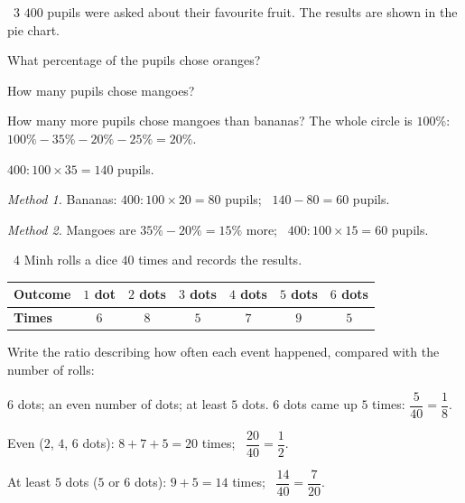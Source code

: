 \begin{exbox}{\ExWord\ 3}
$400$ pupils were asked about their favourite fruit. The results are shown in the pie chart.
\begin{center}
\end{center}
 What percentage of the pupils chose oranges?\par
{} How many pupils chose mangoes?\par
{} How many more pupils chose mangoes than bananas?
\guide
{} The whole circle is $100\%$: $100\%-35\%-20\%-25\%=20\%$.\par
{} $400:100\times35=140$ pupils.\par
{} \emph{Method 1.} Bananas: $400:100\times20=80$ pupils; \ $140-80=60$ pupils.\par
\emph{Method 2.} Mangoes are $35\%-20\%=15\%$ more; \ $400:100\times15=60$ pupils.
\end{exbox}
\gap
\begin{exbox}{\ExWord\ 4}
Minh rolls a dice $40$ times and records the results.
\begin{center}
\begin{tabular}{|l|c|c|c|c|c|c|}
\hline
\textbf{Outcome} & $1$ dot & $2$ dots & $3$ dots & $4$ dots & $5$ dots & $6$ dots\\\hline
\textbf{Times} & $6$ & $8$ & $5$ & $7$ & $9$ & $5$\\\hline
\end{tabular}
\end{center}
Write the ratio describing how often each event happened, compared with the number of rolls:\par
{} $6$ dots; \quad {} an even number of dots; \quad {} at least $5$ dots.
\guide
{} $6$ dots came up $5$ times: $\dfrac{5}{40}=\dfrac{1}{8}$.\par
{} Even ($2$, $4$, $6$ dots): $8+7+5=20$ times; \ $\dfrac{20}{40}=\dfrac12$.\par
{} At least $5$ dots ($5$ or $6$ dots): $9+5=14$ times; \ $\dfrac{14}{40}=\dfrac{7}{20}$.
\end{exbox}
\gap
